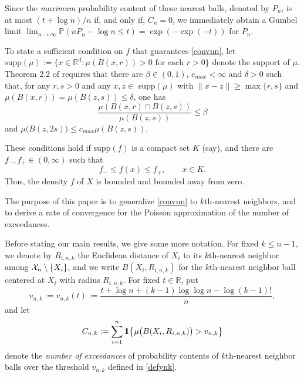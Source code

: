 \documentclass{article}
\theoremstyle{thm}
\theoremstyle{definition}
\theoremstyle{definition}
\theoremstyle{def}
\newcommand{\RR}{\mathbb{R}} %
\newcommand{\ind}{1\hspace{-0,9ex}1}
\begin{document}
Since the {\em maximum} probability content of these nearest balls, denoted by $P_n$, is at most $(t+ \log n)/n$ if, and only if, $C_n =0$,
we immediately obtain a Gumbel limit $\lim_{n\to \infty} \mathbb{P}(nP_n - \log n \le t) = \exp(-\exp(-t))$ for $P_n$.

To state a sufficient condition on $f$ that guarantees \eqref{convnn}, let
$\text{supp}(\mu) := \{x \in \RR^d: \mu (B(x,r)) > 0 \textrm{ for each } r >0\}$ denote the support of $\mu$.
Theorem 2.2 of \cite{GHW19} requires that there are $\beta \in (0,1)$, $c_{max}<\infty$ and $\delta >0$
such that, for any $r,s >0$ and any $x,z \in$ supp$(\mu)$ with
$\|x-z\| \ge \max\{r,s\}$ and  $\mu\left( B(x,r)\right) = \mu\left( B(z,s)\right)\le \delta$, one has
\[
\frac{\mu\left( B(x,r)\cap   B(z,s)\right)}{\mu\left( B(z,s)\right)}
\le \beta
\]
and $\mu\big( B(z, 2s)\big)\le c_{max}\mu\left( B(z,s)\right)$.

These conditions hold if $\text{supp}(f)$ is a compact set $K$ (say), and there are
$f_-,f_+ \in (0,\infty)$ such that
\begin{equation}\label{densitybounds}
f_-\leq f(x)\leq f_+, \qquad x \in K.
\end{equation}
Thus, the density $f$ of $X$ is bounded and bounded away from zero.

The purpose of this paper is to generalize \eqref{convnn} to $k$th-nearest neighbors, and to derive a rate of convergence for the Poisson approximation of {the number of exceedances}. 

Before stating our main results, we give some more notation.  For fixed $k \le n-1$, we denote by $R_{i,n,k}$ the Euclidean
distance of  $X_i$ to its $k$th-nearest neighbor among ${\cal X}_n \setminus \{X_i\}$,
and we write  $B(X_i,R_{i,n,k})$ for the $k$th-nearest neighbor ball centered at $X_i$ with radius $R_{i,n,k}$.  For fixed $t \in \RR$, put
\begin{equation} \label{defynk}
v_{n,k} :=v_{n,k}(t) :=\frac{t+\log n+(k-1)\log\log n-\log(k-1)!}{n},
\end{equation}
and let
\begin{equation}\label{defcnk}
C_{n,k} := \sum_{i=1}^n \ind \big{\{}\mu \big( B(X_i,R_{i,n,k})\big) > v_{n,k}\big{\}}
\end{equation}
denote the {\textit{number of exceedances}} of probability contents of $k$th-nearest neighbor balls over the threshold $v_{n,k}$ defined in \eqref{defynk}.
\end{document}
